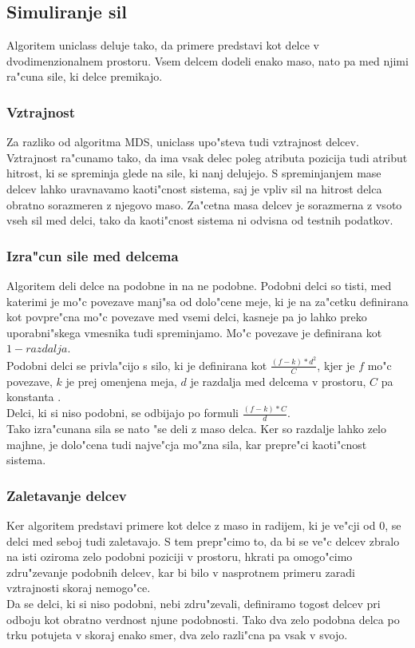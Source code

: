 \documentclass[a4paper]{article}
\begin{document}
	\subsection{Simuliranje sil}
		Algoritem uniclass deluje tako, da primere predstavi kot delce v dvodimenzionalnem prostoru. Vsem delcem dodeli enako maso, nato pa med njimi ra"cuna sile, ki delce premikajo.
		\subsubsection{Vztrajnost}
			Za razliko od algoritma MDS, uniclass upo"steva tudi vztrajnost delcev. Vztrajnost ra"cunamo tako, da ima vsak delec poleg atributa pozicija tudi atribut hitrost, ki se spreminja glede na sile, ki nanj delujejo. S spreminjanjem mase delcev lahko uravnavamo kaoti"cnost sistema, saj je vpliv sil na hitrost delca obratno sorazmeren z njegovo maso. Za"cetna masa delcev je sorazmerna z vsoto vseh sil med delci, tako da kaoti"cnost sistema ni odvisna od testnih podatkov.
		\subsubsection{Izra"cun sile med delcema}
			Algoritem deli delce na podobne in na ne podobne. Podobni delci so tisti, med katerimi je mo"c povezave manj"sa od dolo"cene meje, ki je na za"cetku definirana kot povpre"cna mo"c povezave med vsemi delci, kasneje pa jo lahko preko uporabni"skega vmesnika tudi spreminjamo. Mo"c povezave je definirana kot $ 1 - razdalja $.\\
			Podobni delci se privla"cijo s silo, ki je definirana kot $ \frac{(f - k) * d^2}{C} $, kjer je $f$ mo"c povezave, $k$ je prej omenjena meja, $d$ je razdalja med delcema v prostoru, $C$ pa konstanta . \\
			Delci, ki si niso podobni, se odbijajo po formuli $ \frac{(f - k) * C}{d} $.\\
			Tako izra"cunana sila se nato "se deli z maso delca. Ker so razdalje lahko zelo majhne, je dolo"cena tudi najve"cja mo"zna sila, kar prepre"ci kaoti"cnost sistema.
		\subsubsection{Zaletavanje delcev}
			Ker algoritem predstavi primere kot delce z maso in radijem, ki je ve"cji od 0, se delci med seboj tudi zaletavajo. S tem prepr"cimo to, da bi se ve"c delcev zbralo na isti oziroma zelo podobni poziciji v prostoru, hkrati pa omogo"cimo zdru"zevanje podobnih delcev, kar bi bilo v nasprotnem primeru zaradi vztrajnosti skoraj nemogo"ce.\\
			Da se delci, ki si niso podobni, nebi zdru"zevali, definiramo togost delcev pri odboju kot obratno verdnost njune podobnosti. Tako dva zelo podobna delca po trku potujeta v skoraj enako smer, dva zelo razli"cna pa vsak v svojo.
\end{document}
